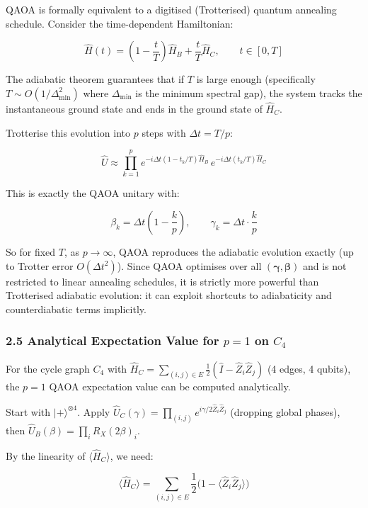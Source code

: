 \documentclass[
  11pt,
]{report}
\begin{document}
QAOA is formally equivalent to a digitised (Trotterised) quantum
annealing schedule. Consider the time-dependent Hamiltonian:

\[\hat{H}(t) = \left(1 - \frac{t}{T}\right)\hat{H}_B + \frac{t}{T}\hat{H}_C, \qquad t \in [0, T]\]

The adiabatic theorem guarantees that if \(T\) is large enough
(specifically \(T \sim O(1/\Delta_{\min}^2)\) where \(\Delta_{\min}\) is
the minimum spectral gap), the system tracks the instantaneous ground
state and ends in the ground state of \(\hat{H}_C\).

Trotterise this evolution into \(p\) steps with \(\Delta t = T/p\):

\[\hat{U} \approx \prod_{k=1}^{p} e^{-i\Delta t (1 - t_k/T)\hat{H}_B} \, e^{-i\Delta t (t_k/T)\hat{H}_C}\]

This is exactly the QAOA unitary with:

\[\beta_k = \Delta t\left(1 - \frac{k}{p}\right), \qquad \gamma_k = \Delta t \cdot \frac{k}{p}\]

So for fixed \(T\), as \(p \to \infty\), QAOA reproduces the adiabatic
evolution exactly (up to Trotter error \(O(\Delta t^2)\)). Since QAOA
optimises over all \((\boldsymbol{\gamma}, \boldsymbol{\beta})\) and is
not restricted to linear annealing schedules, it is strictly more
powerful than Trotterised adiabatic evolution: it can exploit shortcuts
to adiabaticity and counterdiabatic terms implicitly.

\subsubsection{\texorpdfstring{2.5 Analytical Expectation Value for
\(p=1\) on
\(C_4\)}{2.5 Analytical Expectation Value for p=1 on C\_4}}\label{analytical-expectation-value-for-p1-on-c_4}

For the cycle graph \(C_4\) with
\(\hat{H}_C = \sum_{(i,j) \in E} \frac{1}{2}(\hat{I} - \hat{Z}_i \hat{Z}_j)\)
(4 edges, 4 qubits), the \(p=1\) QAOA expectation value can be computed
analytically.

Start with \(|+\rangle^{\otimes 4}\). Apply
\(\hat{U}_C(\gamma) = \prod_{(i,j)} e^{i\gamma/2 \hat{Z}_i\hat{Z}_j}\)
(dropping global phases), then
\(\hat{U}_B(\beta) = \prod_i R_X(2\beta)_i\).

By the linearity of \(\langle \hat{H}_C \rangle\), we need:

\[\langle \hat{H}_C \rangle = \sum_{(i,j) \in E} \frac{1}{2}\bigl(1 - \langle \hat{Z}_i \hat{Z}_j \rangle\bigr)\]
\end{document}
